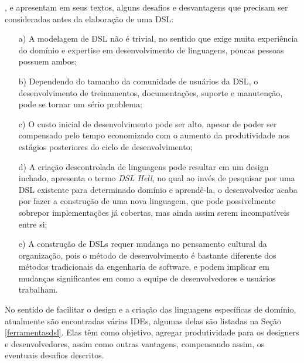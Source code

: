 ,  e  apresentam em seus textos, alguns desafios e desvantagens que precisam ser consideradas antes da elaboração de uma \gls{DSL}:

\begin{enumerate}
    \item[a)] A modelagem de \gls{DSL} não é trivial, no sentido que exige muita experiência do domínio e expertise em desenvolvimento de linguagens, poucas pessoas possuem ambos;
    \item[b)] Dependendo do tamanho da comunidade de usuários da \gls{DSL}, o desenvolvimento de treinamentos, documentações, suporte e manutenção, pode se tornar um sério problema;
    \item[c)] O custo inicial de desenvolvimento pode ser alto, apesar de poder ser compensado pelo tempo economizado com o aumento da produtividade nos estágios posteriores do ciclo de desenvolvimento;
    \item[d)] A criação descontrolada de linguagens pode resultar em um design inchado,  apresenta o termo \textit{DSL Hell}, no qual ao invés de pesquisar por uma \gls{DSL} existente para determinado domínio e aprendê-la, o desenvolvedor acaba por fazer a construção de uma nova linguagem, que pode possivelmente sobrepor implementações já cobertas, mas ainda assim serem incompatíveis entre si;
    \item[e)] A construção de \gls{DSL}s requer mudança no pensamento cultural da organização, pois o método de desenvolvimento é bastante diferente dos métodos tradicionais da engenharia de software, e podem implicar em mudanças significantes em como a equipe de desenvolvedores e usuários trabalham.
    
\end{enumerate}

No sentido de facilitar o design e a criação das linguagens específicas de domínio, atualmente são encontradas várias \gls{IDE}s, algumas delas são listadas na Seção \ref{ferramentasdsl}. Elas têm como objetivo, agregar produtividade para os designers e desenvolvedores, assim como outras vantagens, compensando assim, os eventuais desafios descritos.



